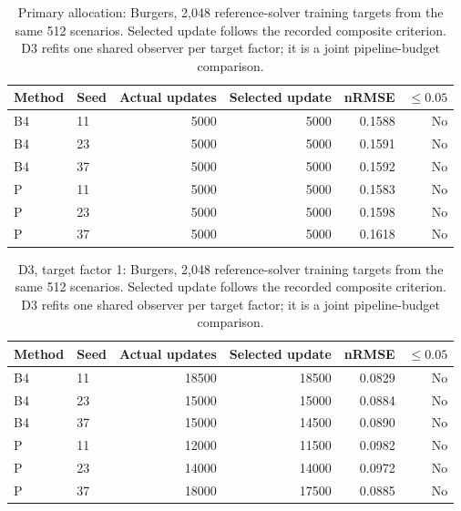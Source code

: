 \begin{table}[!ht]
\centering\small
\caption{Primary allocation: Burgers, 2,048 reference-solver training targets from the same 512 scenarios. Selected update follows the recorded composite criterion. D3 refits one shared observer per target factor; it is a joint pipeline-budget comparison.}\label{tab:scaling_original_1}
\begin{tabular}{@{}llrrrr@{}}\toprule
Method & Seed & Actual updates & Selected update & nRMSE & $\leq0.05$\\\midrule
B4 & 11 & 5000 & 5000 & 0.1588 & No\\
B4 & 23 & 5000 & 5000 & 0.1591 & No\\
B4 & 37 & 5000 & 5000 & 0.1592 & No\\
P & 11 & 5000 & 5000 & 0.1583 & No\\
P & 23 & 5000 & 5000 & 0.1598 & No\\
P & 37 & 5000 & 5000 & 0.1618 & No\\
\bottomrule\end{tabular}
\end{table}

\begin{table}[!ht]
\centering\small
\caption{D3, target factor 1: Burgers, 2,048 reference-solver training targets from the same 512 scenarios. Selected update follows the recorded composite criterion. D3 refits one shared observer per target factor; it is a joint pipeline-budget comparison.}\label{tab:scaling_E3_1}
\begin{tabular}{@{}llrrrr@{}}\toprule
Method & Seed & Actual updates & Selected update & nRMSE & $\leq0.05$\\\midrule
B4 & 11 & 18500 & 18500 & 0.0829 & No\\
B4 & 23 & 15000 & 15000 & 0.0884 & No\\
B4 & 37 & 15000 & 14500 & 0.0890 & No\\
P & 11 & 12000 & 11500 & 0.0982 & No\\
P & 23 & 14000 & 14000 & 0.0972 & No\\
P & 37 & 18000 & 17500 & 0.0885 & No\\
\bottomrule\end{tabular}
\end{table}

